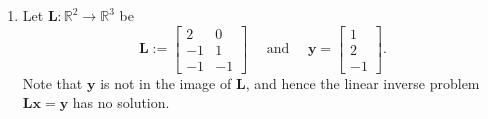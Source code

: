 \documentclass[12pt]{amsart}
\newcommand{\1}{\mathbbm{1}}
\numberwithin{equation}{section}
\numberwithin{Theorem}{section}
\theoremstyle{plain} %
\theoremstyle{definition}
\theoremstyle{remark}
\begin{document}
\begin{enumerate}[1.]
\begin{enumerate}[(a)]
	\item
	\begin{proof}
		As shown in part (d) the image of \(\mathbf{Q}\)projection 
		will be \(\mathbf{P}(\mathcal{V})\)
		thus, \(\mathbf{Q}(\mathcal{V}) = \mathbf{P}(\mathcal{V})\)
		
		And as shown in parts (c) and (e) arbitrary \(\mathbf{v}\in\mathcal{V}\)
		can be written as either
		\[\mathbf{v}=\mathbf{Q}(\mathbf{v})+(\mathbf{I}-\mathbf{Q})\mathbf{v}\]
		or
		\[\mathbf{v}=\mathbf{P}(\mathbf{v})+(\mathbf{I}-\mathbf{P})\mathbf{v}.\]
		Combining these two results, 
		\(\mathbf{Q}(\mathbf{v})=\mathbf{P}(\mathbf{v})\)
		and since \(\mathbf{v}\) was arbitrary
		\(\mathbf{Q}=\mathbf{P}\).
	\end{proof}
\end{enumerate}

\clearpage

\item Let \(\mathbf{L}:\mathbb{R}^{2}\to\mathbb{R}^{3}\) be
\[\mathbf{L}:=\begin{bmatrix} 2 & 0\\ -1 & 1\\ -1 & -1\end{bmatrix}\quad\text{ and }\quad \mathbf{y} = \begin{bmatrix}1\\2\\-1\end{bmatrix}.\]
Note that \(\mathbf{y}\) is not in the image of \(\mathbf{L}\), and hence the linear inverse problem \(\mathbf{Lx}=\mathbf{y}\) has no solution. \bigskip

\begin{enumerate}


\end{enumerate}
\end{enumerate}
\end{document}
